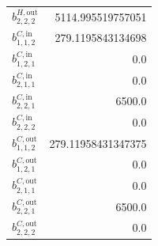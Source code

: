 \documentclass{article}%
\begin{document}
\begin{multicols*}{3}
\begin{supertabular}{lr}
	$b_{2,2,2}^{H,\text{out}}$ & 5114.995519757051 \\%
	$b_{1,1,2}^{C,\text{in}}$ & 279.1195843134698 \\%
	$b_{1,2,1}^{C,\text{in}}$ & 0.0 \\%
	$b_{2,1,1}^{C,\text{in}}$ & 0.0 \\%
	$b_{2,2,1}^{C,\text{in}}$ & 6500.0 \\%
	$b_{2,2,2}^{C,\text{in}}$ & 0.0 \\%
	$b_{1,1,2}^{C,\text{out}}$ & 279.11958431347375 \\%
	$b_{1,2,1}^{C,\text{out}}$ & 0.0 \\%
	$b_{2,1,1}^{C,\text{out}}$ & 0.0 \\%
	$b_{2,2,1}^{C,\text{out}}$ & 6500.0 \\%
	$b_{2,2,2}^{C,\text{out}}$ & 0.0 \\%
\end{supertabular}%
\end{multicols*}%
\end{document}
